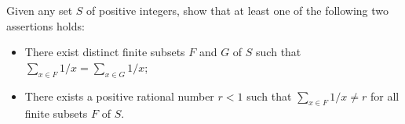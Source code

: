 Given any set $S$ of positive integers, show that at least one of the following two assertions holds:
\begin{itemize}
\item[(1)] There exist distinct finite subsets $F$ and $G$ of $S$ such that $\sum_{x \in F} 1/x = \sum_{x \in G} 1/x$;
\item[(2)] There exists a positive rational number $r < 1$ such that $\sum_{x \in F} 1/x \neq r$ for all finite subsets $F$ of $S$.
\end{itemize}
